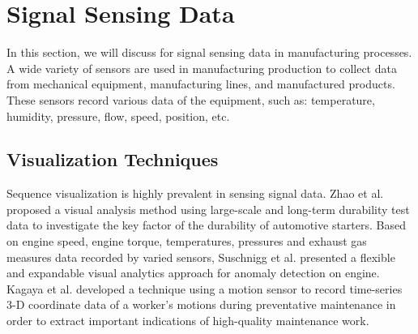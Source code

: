 \documentclass[a4paper,fleqn]{cas-dc}
\begin{document}
\section{Signal Sensing Data}
In this section, we will discuss for signal sensing data in manufacturing processes.
A wide variety of sensors are used in manufacturing production to collect data from mechanical equipment, manufacturing lines, and manufactured products.
These sensors record various data of the equipment, such as: temperature, humidity, pressure, flow, speed, position, etc.

\subsection{Visualization Techniques}
Sequence visualization is highly prevalent in sensing signal data.
Zhao et al. \cite{zhao2019visual} proposed a visual analysis method using large-scale and long-term durability test data to  investigate the key factor of the durability of automotive starters.
Based on engine speed, engine torque, temperatures, pressures and exhaust gas measures data recorded by varied sensors, Suschnigg et al. \cite{suschnigg2020exploration} presented a flexible and expandable visual analytics approach for anomaly detection on engine.
Kagaya et al. \cite{Kagaya2017} developed a technique using a motion sensor to record time-series 3-D coordinate data of a worker's motions during preventative maintenance in order to extract important indications of high-quality maintenance work.
\end{document}

